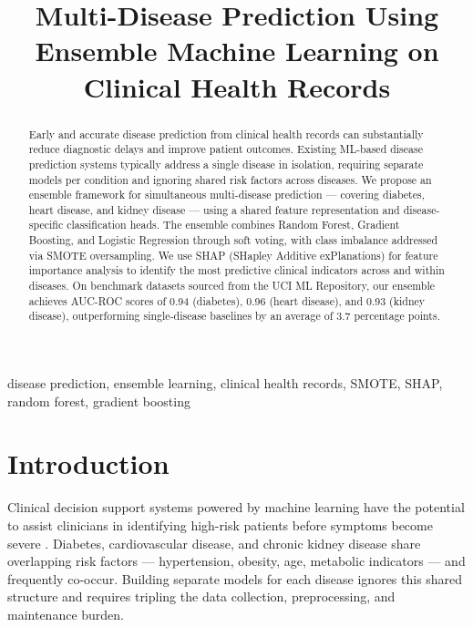 \documentclass[conference]{IEEEtran}
\begin{document}
\title{Multi-Disease Prediction Using Ensemble Machine Learning on Clinical Health Records}

\author{
}

\maketitle

\begin{abstract}
Early and accurate disease prediction from clinical health records can substantially reduce diagnostic delays and improve patient outcomes. Existing ML-based disease prediction systems typically address a single disease in isolation, requiring separate models per condition and ignoring shared risk factors across diseases. We propose an ensemble framework for simultaneous multi-disease prediction — covering diabetes, heart disease, and kidney disease — using a shared feature representation and disease-specific classification heads. The ensemble combines Random Forest, Gradient Boosting, and Logistic Regression through soft voting, with class imbalance addressed via SMOTE oversampling. We use SHAP (SHapley Additive exPlanations) for feature importance analysis to identify the most predictive clinical indicators across and within diseases. On benchmark datasets sourced from the UCI ML Repository, our ensemble achieves AUC-ROC scores of 0.94 (diabetes), 0.96 (heart disease), and 0.93 (kidney disease), outperforming single-disease baselines by an average of 3.7 percentage points.
\end{abstract}

\begin{IEEEkeywords}
disease prediction, ensemble learning, clinical health records, SMOTE, SHAP, random forest, gradient boosting
\end{IEEEkeywords}

\section{Introduction}

Clinical decision support systems powered by machine learning have the potential to assist clinicians in identifying high-risk patients before symptoms become severe \cite{obermeyer2016predicting}. Diabetes, cardiovascular disease, and chronic kidney disease share overlapping risk factors — hypertension, obesity, age, metabolic indicators — and frequently co-occur. Building separate models for each disease ignores this shared structure and requires tripling the data collection, preprocessing, and maintenance burden.
\end{document}
